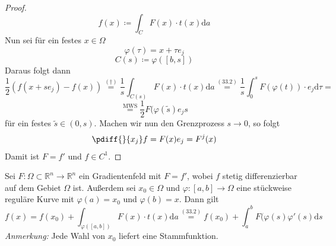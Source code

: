 \begin{proof}
\begin{equation*}
	f(x)\coloneqq\int_CF(x)\cdot t(x)\mathrm{d}a
	\tag{$\dagger$}
\end{equation*}
Nun sei für ein festes $x\in\Omega$
\begin{equation*}
	\varphi(\tau)=x+\tau e_j
\end{equation*}
\begin{equation*}
	C(s)\coloneqq\varphi([b,s])
\end{equation*}
Daraus folgt dann
\begin{equation*}
	\frac{1}{2}\left(f(x+se_j)-f(x)\right) 
	\stackrel{(\dagger)}{=} 
	\frac{1}{s}\int_{C(s)}F(x)\cdot t(x)\mathrm{d}a 
	\stackrel{(33.2)}{=}  
	\frac{1}{s}\int_0^s F(\varphi(t))\cdot e_j\mathrm{d}\tau = 
\end{equation*}
\begin{equation*}
	\stackrel{\mathrm{MWS}}{=} 
	\frac{1}{2}F(\varphi(\tilde{s})e_js
\end{equation*}
für ein festes $\tilde{s}\in(0,s)$. Machen wir nun den 
Grenzprozess $s\rightarrow 0$, so folgt
\begin{equation*}
	\pdiff{}{x_j}f=F(x)e_j=F^j(x)
\end{equation*}
Damit ist $F=f'$ und $f\in C^1$. 
\end{proof}
\newpage
\begin{satz}
Sei $F:\Omega\subset\mathbb{R}^n\rightarrow\mathbb{R}^n$ ein 
Gradientenfeld mit $F=f'$, wobei $f$ stetig differenzierbar auf 
dem Gebiet $\Omega$ ist. Außerdem sei $x_0\in\Omega$ und 
$\varphi:[a,b]\rightarrow\Omega$ eine stückweise reguläre Kurve 
mit $\varphi(a)=x_0$ und $\varphi(b)=x$. Dann gilt
\begin{equation*}
	f(x)=f(x_0)+\int_{\varphi([a,b])} F(x)\cdot t(x) \mathrm{d}a
	\stackrel{(33.2)}{=} 
	f(x_0)+\int_a^b F(\varphi(s)\varphi'(s)\mathrm{d}s
\end{equation*}
\emph{Anmerkung:} Jede Wahl von $x_0$ liefert eine 
Stammfunktion.
\end{satz}

